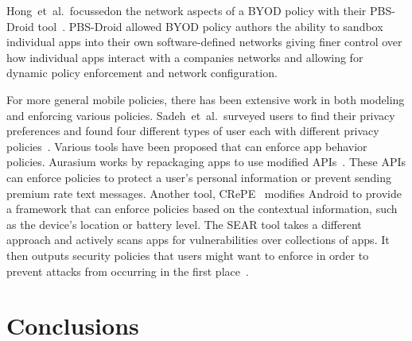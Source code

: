 \documentclass[a4paper]{article}
\makeatletter
\newcommand{\etal}[0]{et~al{.}\@}
\makeatother
\begin{document}
Hong~\etal~focussedon the network aspects of a \ac{BYOD} policy with their
PBS-Droid tool~\cite{sungmin_hong_towards_2016}.  PBS-Droid allowed BYOD policy
authors the ability to sandbox individual apps into their own software-defined
networks giving finer control over how individual apps interact with a companies
networks and allowing for dynamic policy enforcement and network configuration.

For more general mobile policies, there has been extensive work in both
modeling and enforcing various policies.  Sadeh~\etal~surveyed users to find
their privacy preferences and found four different types of user each with
different privacy policies~\cite{sadeh_understanding_2009}.  Various tools have
been proposed that can enforce app behavior policies.  Aurasium works by
repackaging apps to use modified APIs~\cite{xu_aurasium:_2012}.  These APIs can
enforce policies to protect a user's personal information or prevent sending
premium rate text messages.  Another tool, CRePE~\cite{conti_crepe:_2010}
modifies Android to provide a framework that can enforce policies based
on the contextual information, such as the device's location or battery level.
The SEAR tool takes a different approach and actively scans apps for
vulnerabilities over collections of apps.  It then outputs security policies
that users might want to enforce in order to prevent attacks from occurring in
the first place~\cite{bagheri_practical_2016}.

\section{Conclusions}
\label{sec:conclusions}

{}

\end{document}
